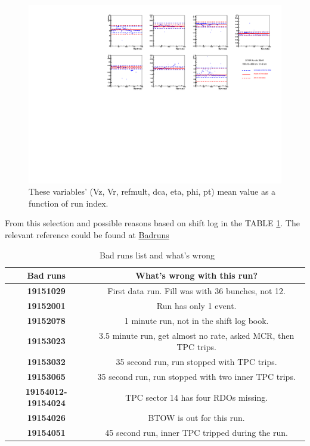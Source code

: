 \begin{figure}[ht]
\centering
\includegraphics[scale=0.9]{chapter1/fig/badruns.pdf}
\caption{ These variables' (Vz, Vr, refmult, dca, eta, phi, pt) mean value as a function of run index.}
\label{fig:bad}
\end{figure}

From this selection and possible reasons based on shift log in the TABLE \ref{badruns}. The relevant reference could be found at \href{https://drupal.star.bnl.gov/STAR/system/files/Good_run_list_3.85_1.pdf}{Badruns}

\begin{table}[h]
\centering
\caption{\ Bad runs list and what's wrong}
\label{badruns}
\begin{tabular}{cc}
\hline
Bad runs & What's wrong with this run? \\
\hline
\textbf{19151029} & First data run. Fill was with 36 bunches, not 12. \\
\textbf{19152001} & Run has only 1 event.  \\
\textbf{19152078} & 1 minute run, not in the shift log book. \\
\textbf{19153023} & 3.5 minute run, get almost no rate, asked MCR, then TPC trips. \\
\textbf{19153032} & 35 second run, run stopped with TPC trips. \\
\textbf{19153065} & 35 second run, run stopped with two inner TPC trips. \\
\textbf{19154012-19154024} & TPC sector 14 has four RDOs missing. \\
\textbf{19154026} & BTOW is out for this run. \\
\textbf{19154051} & 45 second run, inner TPC tripped during the run. \\
\hline
\end{tabular}
\end{table}


